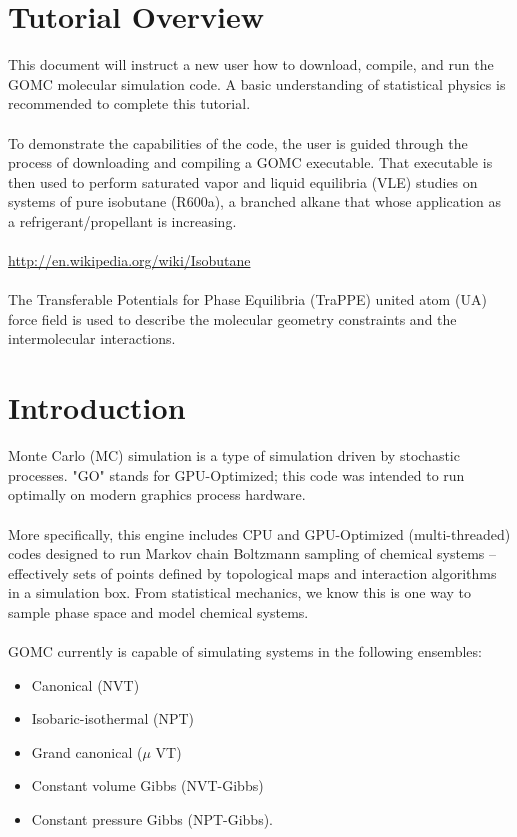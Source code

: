 \section{Tutorial Overview}
This document will instruct a new user how to download, compile, and run the GOMC molecular simulation code.  A basic understanding of statistical physics is recommended to complete this tutorial.\\\\
To demonstrate the capabilities of the code, the user is guided through the process of downloading and compiling a GOMC executable.  That executable is then used to perform saturated vapor and liquid equilibria (VLE) studies on systems of pure isobutane (R600a), a branched alkane that whose application as a refrigerant/propellant is increasing.\\\\
\url{http://en.wikipedia.org/wiki/Isobutane}\\\\
The Transferable Potentials for Phase Equilibria (TraPPE) united atom (UA) force field is used to describe the molecular geometry constraints and the intermolecular interactions.

\section{Introduction}
Monte Carlo (MC) simulation is a type of simulation driven by stochastic processes.  "GO" stands for GPU-Optimized; this code was intended to run optimally on modern graphics process hardware.\\\\
More specifically, this engine includes CPU and GPU-Optimized (multi-threaded) codes designed to run Markov chain Boltzmann sampling of chemical systems -- effectively sets of points defined by topological maps and interaction algorithms in a simulation box.  From statistical mechanics, we know this is one way to sample phase space and model chemical systems.\\\\
GOMC currently is capable of simulating systems in the following ensembles: 
\begin{itemize}
	\item Canonical (NVT)
	\item Isobaric-isothermal (NPT)
	\item Grand canonical ($\mu$ VT) 
	\item Constant volume Gibbs (NVT-Gibbs) 
	\item Constant pressure Gibbs (NPT-Gibbs). \\
\end{itemize}

